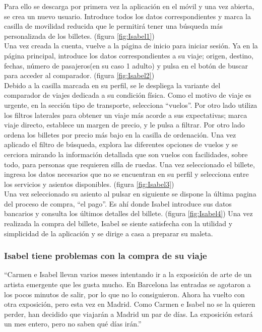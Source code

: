 Para ello se descarga por primera vez la aplicación en el móvil y una vez abierta, se crea un nuevo usuario. Introduce todos los datos correspondientes y marca la 
casilla de movilidad reducida que le permitirá tener una búsqueda más personalizada de los billetes. (figura \ref{fig:Isabel1}) \\


Una vez creada la cuenta, vuelve a la página de inicio para iniciar sesión. Ya en la página principal, introduce los datos correspondientes a su viaje; origen, 
destino, fechas, número de pasajeros(en su caso 1 adulto) y pulsa en el botón de buscar para acceder al comparador. (figura \ref{fig:Isabel2}) \\


Debido a la casilla marcada en su perfil, se le despliega la variante del comparador de viajes dedicada a su condición física. Como el motivo de viaje es urgente, en la sección tipo de transporte, selecciona “vuelos”. Por otro lado utiliza los filtros laterales para obtener un viaje más acorde a sus expectativas; marca viaje directo, establece un margen de precio, y le pulsa a filtrar. Por otro lado ordena los billetes por precio más bajo en la casilla de ordenación.
Una vez aplicado el filtro de búsqueda, explora las diferentes opciones de vuelos y se cerciora mirando la información detallada que son vuelos con facilidades, sobre todo, para personas que requieren silla de ruedas.
Una vez seleccionado el billete, ingresa los datos necesarios que no se encuentran en su perfil y selecciona entre los servicios y asientos disponibles. (figura \ref{fig:Isabel3}) \\


Una vez seleccionado su asiento al pulsar en siguiente se dispone la última pagina del proceso de compra, “el pago”. Es ahí donde Isabel introduce sus datos bancarios 
y consulta los últimos detalles del billete. (figura \ref{fig:Isabel4}) Una vez realizada la compra del billete, Isabel se siente satisfecha con la utilidad y simplicidad de la aplicación y 
se dirige a casa a preparar su maleta.

\subsubsection{Isabel tiene problemas con la compra de su viaje}
“Carmen e Isabel llevan varios meses intentando ir a la exposición de arte de un artista emergente que les gusta mucho. En Barcelona las entradas se agotaron a los pocos minutos de salir, por lo que no lo consiguieron. Ahora ha vuelto con otra exposición, pero esta vez en Madrid.
Como Carmen e Isabel no se la quieren perder, han decidido que viajarán a Madrid un par de días. La exposición estará un mes entero, pero no saben qué días irán.” \\

